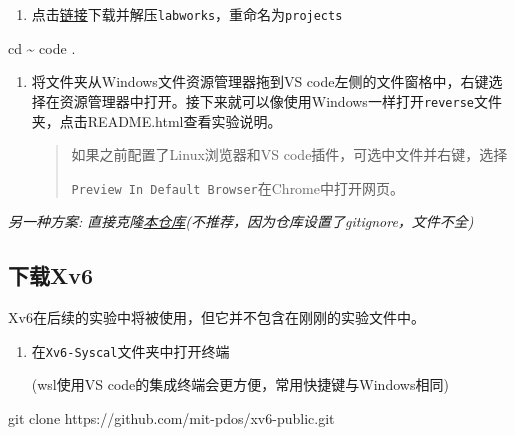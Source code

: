\documentclass{article}
\newenvironment{Shaded}{}{}
\newcommand{\BuiltInTok}[1]{\textcolor[rgb]{0.00,0.50,0.00}{#1}}
\newcommand{\ExtensionTok}[1]{#1}
\newcommand{\FunctionTok}[1]{\textcolor[rgb]{0.02,0.16,0.49}{#1}}
\newcommand{\NormalTok}[1]{#1}
\begin{document}
\begin{enumerate}
  \def\labelenumi{\arabic{enumi}.}
  \item
        点击\href{https://seunic-my.sharepoint.cn/personal/101011912_seu_edu_cn/_layouts/15/download.aspx?SourceUrl=/personal/101011912_seu_edu_cn/Documents/教学/Teaching/操作系统/OSC_labs/Xv6.labworks.7z}{链接}下载并解压\texttt{labworks}，重命名为\texttt{projects}
\end{enumerate}

\begin{Shaded}
  \begin{Highlighting}[]
    \BuiltInTok{cd}\NormalTok{ \textasciitilde{}}
    \ExtensionTok{code}\NormalTok{ .}
  \end{Highlighting}
\end{Shaded}

\begin{enumerate}
  \def\labelenumi{\arabic{enumi}.}
  \item
        将文件夹从Windows文件资源管理器拖到VS
        code左侧的文件窗格中，右键选择在资源管理器中打开。接下来就可以像使用Windows一样打开\texttt{reverse}文件夹，点击README.html查看实验说明。

        \begin{quote}
          如果之前配置了Linux浏览器和VS code插件，可选中文件并右键，选择

          \texttt{Preview\ In\ Default\ Browser}在Chrome中打开网页。
        \end{quote}
\end{enumerate}

\emph{另一种方案:
  直接克隆\href{https://github.com/julymiaw/Operating_System}{本仓库}(不推荐，因为仓库设置了gitignore，文件不全)}

\subsection{下载Xv6}\label{ux4e0bux8f7dxv6}

Xv6在后续的实验中将被使用，但它并不包含在刚刚的实验文件中。

\begin{enumerate}
  \def\labelenumi{\arabic{enumi}.}
  \item
        在\texttt{Xv6-Syscal}文件夹中打开终端

        (wsl使用VS code的集成终端会更方便，常用快捷键与Windows相同)
\end{enumerate}

\begin{Shaded}
  \begin{Highlighting}[]
    \FunctionTok{git}\NormalTok{ clone https://github.com/mit{-}pdos/xv6{-}public.git}
  \end{Highlighting}
\end{Shaded}
\end{document}
